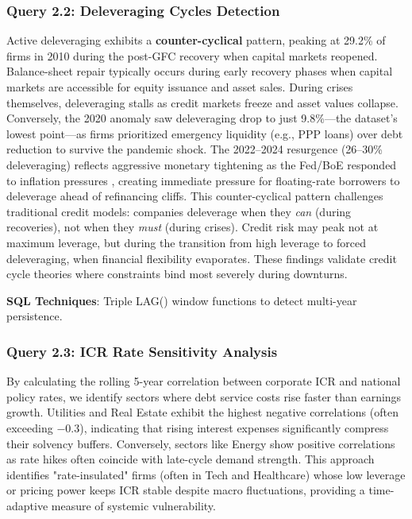 \documentclass[10pt,a4paper]{article}
\begin{document}
\subsubsection{Query 2.2: Deleveraging Cycles Detection}
Active deleveraging exhibits a \textbf{counter-cyclical} pattern, peaking at 29.2\% of firms in 2010 during the post-GFC recovery when capital markets reopened. Balance-sheet repair typically occurs during early recovery phases when capital markets are accessible for equity issuance and asset sales. During crises themselves, deleveraging stalls as credit markets freeze and asset values collapse. Conversely, the 2020 anomaly saw deleveraging drop to just 9.8\%—the dataset's lowest point—as firms prioritized emergency liquidity (e.g., PPP loans) over debt reduction to survive the pandemic shock. The 2022--2024 resurgence (26--30\% deleveraging) reflects aggressive monetary tightening as the Fed/BoE responded to inflation pressures \cite{fed_rate_hikes2022}, creating immediate pressure for floating-rate borrowers to deleverage ahead of refinancing cliffs. This counter-cyclical pattern challenges traditional credit models: companies deleverage when they \textit{can} (during recoveries), not when they \textit{must} (during crises). Credit risk may peak not at maximum leverage, but during the transition from high leverage to forced deleveraging, when financial flexibility evaporates. These findings validate credit cycle theories \cite{kiyotaki1997,bernanke1999} where constraints bind most severely during downturns.

\textbf{SQL Techniques}: Triple LAG() window functions to detect multi-year persistence.
    


\subsubsection{Query 2.3: ICR Rate Sensitivity Analysis}
By calculating the rolling 5-year correlation between corporate ICR and national policy rates, we identify sectors where debt service costs rise faster than earnings growth. Utilities and Real Estate exhibit the highest negative correlations (often exceeding $-0.3$), indicating that rising interest expenses significantly compress their solvency buffers. Conversely, sectors like Energy show positive correlations as rate hikes often coincide with late-cycle demand strength. This approach identifies "rate-insulated" firms (often in Tech and Healthcare) whose low leverage or pricing power keeps ICR stable despite macro fluctuations, providing a time-adaptive measure of systemic vulnerability.
\end{document}
